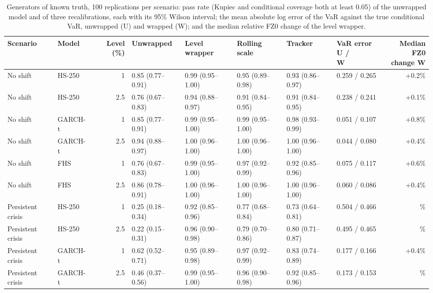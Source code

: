 \begin{table}[htbp]
\centering
\small
\caption{Generators of known truth, 100 replications per scenario: pass rate (Kupiec and conditional coverage both at least 0.05) of the unwrapped model and of three recalibrations, each with its 95\% Wilson interval; the mean absolute log error of the VaR against the true conditional VaR, unwrapped (U) and wrapped (W); and the median relative FZ0 change of the level wrapper.}
\label{tab:generators}
{\footnotesize\setlength{\tabcolsep}{4pt}
\begin{adjustbox}{max width=\textwidth}
\begin{tabular}{llrlllllr}
\toprule
Scenario & Model & Level (\%) & Unwrapped & Level wrapper & Rolling scale & Tracker & \makecell[bl]{VaR error U / \\ W} & \makecell[br]{Median FZ0 \\ change W} \\
\midrule
No shift & HS-250 & 1 & 0.85 (0.77--0.91) & 0.99 (0.95--1.00) & 0.95 (0.89--0.98) & 0.93 (0.86--0.97) & 0.259 / 0.265 & \relax +0.2\% \\
No shift & HS-250 & 2.5 & 0.76 (0.67--0.83) & 0.94 (0.88--0.97) & 0.91 (0.84--0.95) & 0.91 (0.84--0.95) & 0.238 / 0.241 & \relax +0.1\% \\
No shift & GARCH-t & 1 & 0.85 (0.77--0.91) & 0.99 (0.95--1.00) & 0.99 (0.95--1.00) & 0.98 (0.93--0.99) & 0.051 / 0.107 & \relax +0.8\% \\
No shift & GARCH-t & 2.5 & 0.94 (0.88--0.97) & 1.00 (0.96--1.00) & 1.00 (0.96--1.00) & 1.00 (0.96--1.00) & 0.044 / 0.080 & \relax +0.4\% \\
No shift & FHS & 1 & 0.76 (0.67--0.83) & 0.99 (0.95--1.00) & 0.97 (0.92--0.99) & 0.92 (0.85--0.96) & 0.075 / 0.117 & \relax +0.6\% \\
No shift & FHS & 2.5 & 0.86 (0.78--0.91) & 1.00 (0.96--1.00) & 1.00 (0.96--1.00) & 1.00 (0.96--1.00) & 0.060 / 0.086 & \relax +0.4\% \\
Persistent crisis & HS-250 & 1 & 0.25 (0.18--0.34) & 0.92 (0.85--0.96) & 0.77 (0.68--0.84) & 0.73 (0.64--0.81) & 0.504 / 0.466 & \relax -9.4\% \\
Persistent crisis & HS-250 & 2.5 & 0.22 (0.15--0.31) & 0.96 (0.90--0.98) & 0.79 (0.70--0.86) & 0.80 (0.71--0.87) & 0.495 / 0.465 & \relax -6.5\% \\
Persistent crisis & GARCH-t & 1 & 0.62 (0.52--0.71) & 0.95 (0.89--0.98) & 0.97 (0.92--0.99) & 0.83 (0.74--0.89) & 0.177 / 0.166 & \relax +0.4\% \\
Persistent crisis & GARCH-t & 2.5 & 0.46 (0.37--0.56) & 0.99 (0.95--1.00) & 0.96 (0.90--0.98) & 0.92 (0.85--0.96) & 0.173 / 0.153 & \relax -0.1\% \\

\end{tabular}
\end{adjustbox}}
\end{table}
